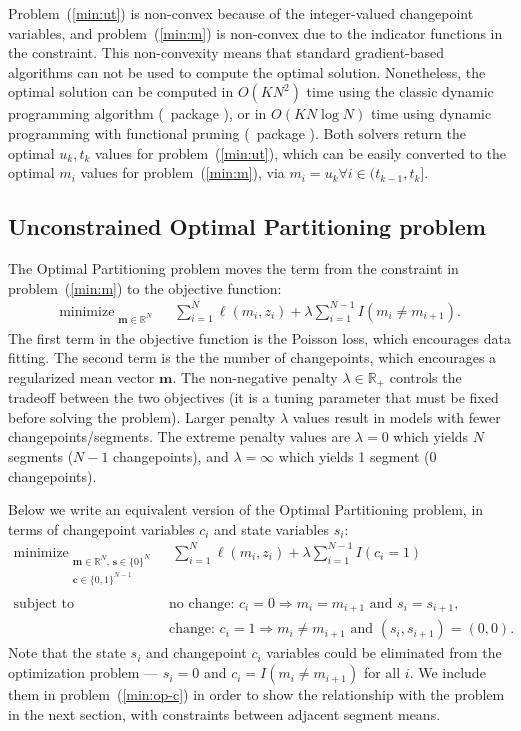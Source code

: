 \documentclass[article]{jss}
\newcommand{\R}{\proglang{R}}
\DeclareMathOperator*{\minimize}{minimize}
\newcommand{\RR}{\mathbb R}
\begin{document}
Problem~(\ref{min:ut}) is non-convex because of the integer-valued
changepoint variables, and problem~(\ref{min:m}) is non-convex due to
the indicator functions in the constraint. This non-convexity means
that standard gradient-based algorithms can not be used to compute the
optimal solution. Nonetheless, the optimal solution can be computed in
$O(KN^2)$ time using the classic dynamic programming algorithm (\R\
package ), or in $O(KN\log N)$ time using dynamic
programming with functional pruning (\R\ package \pkg{jointseg}). Both
solvers return the optimal $u_k,t_k$ values for
problem~(\ref{min:ut}), which can be easily converted to the optimal
$m_i$ values for problem~(\ref{min:m}), via
$m_i=u_k \forall i\in (t_{k-1},t_k]$.

\subsection{Unconstrained Optimal Partitioning problem}

The Optimal Partitioning problem moves the term from the constraint in
problem~(\ref{min:m}) to the objective
function:
\begin{align}
  \label{min:op}
  \minimize_{
  \substack{
  \mathbf m\in\RR^N
  }
  } &\ \ 
      \sum_{i=1}^N \ell(m_i, z_i) + \lambda \sum_{i=1}^{N-1} I(m_i\neq m_{i+1}).
\end{align}
The first term in the objective function is the Poisson loss, which
encourages data fitting. The second term is the the number of
changepoints, which encourages a regularized mean vector $\mathbf
m$. The non-negative penalty $\lambda\in\RR_+$ controls the tradeoff
between the two objectives (it is a tuning parameter that must be
fixed before solving the problem). Larger penalty $\lambda$ values
result in models with fewer changepoints/segments. The extreme penalty
values are $\lambda=0$ which yields $N$ segments ($N-1$ changepoints),
and $\lambda=\infty$ which yields 1 segment (0 changepoints).

Below we write an equivalent version of the Optimal Partitioning
problem, in terms of changepoint variables $c_i$ and state variables
$s_i$:
\begin{align}
  \label{min:op-c}
  \minimize_{
  \substack{
  \mathbf m\in\RR^N,\, \mathbf s\in\{0\}^N\\
  \mathbf c\in\{0,1\}^{N-1}\\
  }
  } &\ \ 
      \sum_{i=1}^N \ell(m_i, z_i) + \lambda \sum_{i=1}^{N-1} I(c_i=1) \\
  \text{subject to\ \ } &\ \text{no change: }c_i = 0 \Rightarrow m_i = m_{i+1}\text{ and } s_i=s_{i+1}, \nonumber\\
    &\ \text{change: }c_i = 1 \Rightarrow m_i \neq m_{i+1}\text{ and }(s_i,s_{i+1})=(0,0).\label{eq:change-constraint}
\end{align}
Note that the state $s_i$ and changepoint $c_i$ variables could be
eliminated from the optimization problem --- $s_i=0$ and 
$c_i=I(m_i\neq m_{i+1})$ for all $i$. We include them in problem~(\ref{min:op-c})
in order to show the relationship with the problem in the next
section, with constraints between adjacent segment means.
\end{document}
